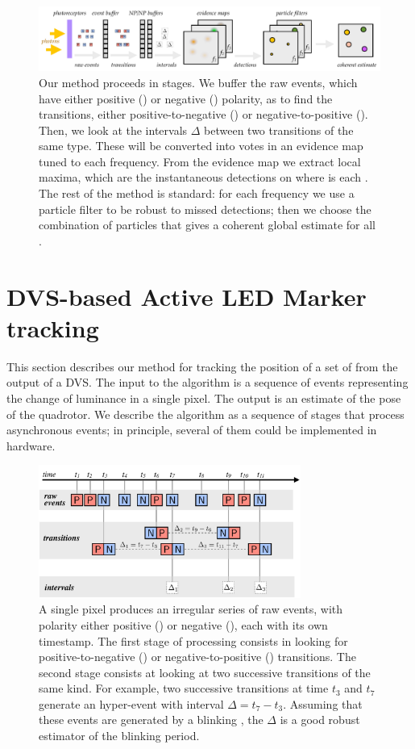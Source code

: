 \begin{figure}
\centering{}\includegraphics[width=16cm]{figures/slides/overall1}\caption{Our method proceeds in stages. We buffer the raw events, which have
either positive (\pP) or negative (\pN) polarity, as to find the
transitions, either positive-to-negative (\pPN) or negative-to-positive
(\pNP). Then, we look at the intervals $\Delta$ between two transitions
of the same type. These will be converted into votes in an evidence
map tuned to each frequency. From the evidence map we extract local
maxima, which are the instantaneous detections on where is each \ALM.
The rest of the method is standard: for each frequency we use a particle
filter to be robust to missed detections; then we choose the combination
of particles that gives a coherent global estimate for all \ALMs.}
\end{figure}



\section{DVS-based Active LED Marker tracking }

This section describes our method for tracking the position of a set
of \ALMs from the output of a DVS. The input to the algorithm is
a sequence of events representing the change of luminance in a single
pixel. The output is an estimate of the pose of the quadrotor. We
describe the algorithm as a sequence of stages that process asynchronous
events; in principle, several of them could be implemented in hardware.

\begin{figure}[H]
\includegraphics[width=8.6cm]{figures/slides/stages2}

\caption{A single pixel produces an irregular series of raw events, with polarity
either positive (\pP) or negative (\pN), each with its own timestamp.
The first stage of processing consists in looking for positive-to-negative
(\pPN) or negative-to-positive (\pNP) transitions. The second stage
consists at looking at two successive transitions of the same kind.
For example, two successive \pPN transitions at time $t_{3}$ and
$t_{7}$ generate an hyper-event with interval $\Delta=t_{7}-t_{3}$.
Assuming that these events are generated by a blinking \ALM, the
$\Delta$ is a good robust estimator of the blinking period.}
\end{figure}




